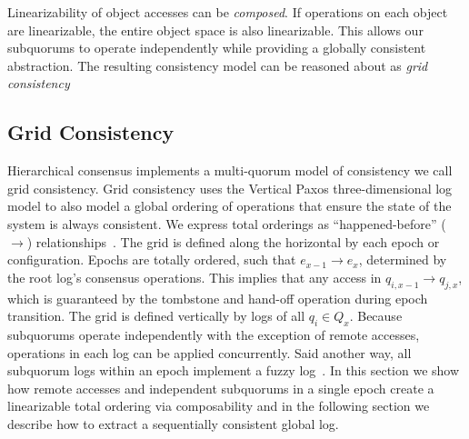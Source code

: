Linearizability of object accesses can be \emph{composed}.
If operations on each object are linearizable, the entire object space is also linearizable.
This allows our subquorums to operate independently while providing a globally consistent abstraction.
The resulting consistency model can be reasoned about as \emph{grid consistency}

\subsection{Grid Consistency}
\label{ch03_grid_consistency}

Hierarchical consensus implements a multi-quorum model of consistency we call grid consistency.
Grid consistency uses the Vertical Paxos three-dimensional log model to also model a global ordering of operations that ensure the state of the system is always consistent.
We express total orderings as ``happened-before'' ($\rightarrow$) relationships~\cite{lamport_time_1978}.
The grid is defined along the horizontal by each epoch or configuration.
Epochs are totally ordered, such that $e_{x-1} \rightarrow e_{x}$, determined by the root log's consensus operations.
This implies that any access in $q_{i,x-1} \rightarrow q_{j,x}$, which is guaranteed by the tombstone and hand-off operation during epoch transition.
The grid is defined vertically by logs of all $q_i \in Q_x$.
Because subquorums operate independently with the exception of remote accesses, operations in each log can be applied concurrently.
Said another way, all subquorum logs within an epoch implement a fuzzy log~\cite{fuzzy_log}.
In this section we show how remote accesses and independent subquorums in a single epoch create a linearizable total ordering via composability and in the following section we describe how to extract a sequentially consistent global log.

